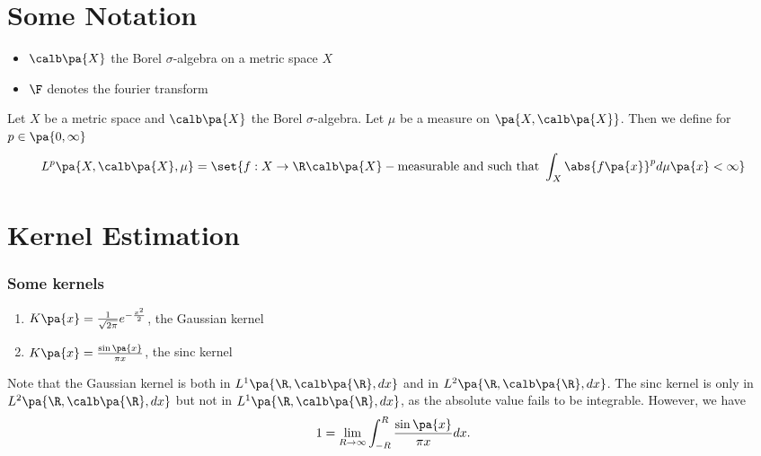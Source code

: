 \section{Some Notation}
\begin{itemize}
  \item $\calb\pa{X}$ the Borel $\sigma$-algebra on a metric space $X$
  \item $\F$ denotes the fourier transform
\end{itemize}
\begin{definition}
  Let $X$ be a metric space and $\calb\pa{X}$ the Borel $\sigma$-algebra. Let $\mu$ be a measure on $\pa{X,\calb\pa{X}}$. Then we define for $p\in \pa{0,\infty}$
  \begin{equation}
    L^p\pa{X,\calb\pa{X},\mu} = \set{f:X\rightarrow \R \calb\pa{X}-\text{measurable and such that } \int_X \abs{f\pa{x}}^p d\mu\pa{x}<\infty }
  \end{equation}
\end{definition}
\newpage
{}
\section{Kernel Estimation}\label{section:kernel}
\subsubsection*{Some kernels}
\begin{enumerate}
  \item\label{ker:gauss} $K\pa{x} = \frac{1}{\sqrt{2\pi}} e^{-\frac{x^2}{2}}$, the Gaussian kernel
  \item\label{ker:sinc} $K\pa{x} = \frac{\sin\pa{x}}{\pi x}$, the sinc kernel
\end{enumerate}
Note that the Gaussian kernel is both in $L^1\pa{\R,\calb\pa{\R},dx}$ and in $L^2\pa{\R,\calb\pa{\R},dx}$. The sinc kernel is only in $L^2\pa{\R,\calb\pa{\R},dx}$ but not in $L^1\pa{\R,\calb\pa{\R},dx}$, as the absolute value fails to be integrable. However, we have
\begin{equation}
  1 = \lim_{R\rightarrow \infty}\int_{-R}^R \frac{\sin\pa{x}}{\pi x} dx.
\end{equation}
